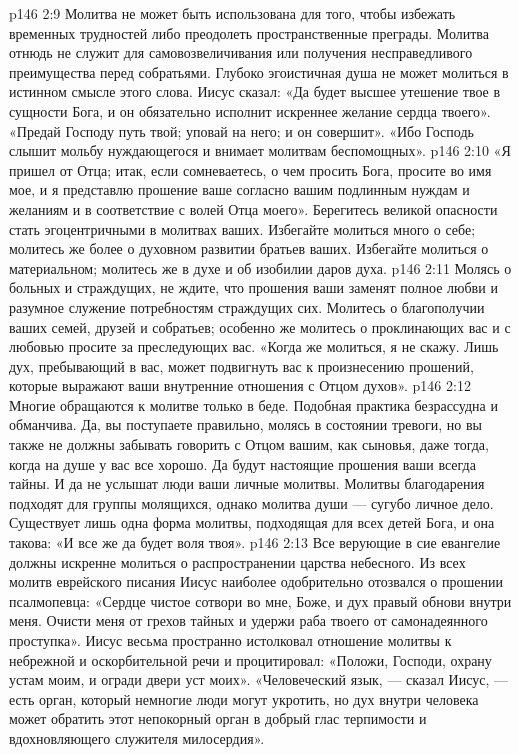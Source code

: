 \vs p146 2:9 \pc {}\bibnobreakspace Молитва не может быть использована для того, чтобы избежать временных трудностей либо преодолеть пространственные преграды. Молитва отнюдь не служит для самовозвеличивания или получения несправедливого преимущества перед собратьями. Глубоко эгоистичная душа не может молиться в истинном смысле этого слова. Иисус сказал: «Да будет высшее утешение твое в сущности Бога, и он обязательно исполнит искреннее желание сердца твоего». «Предай Господу путь твой; уповай на него; и он совершит». «Ибо Господь слышит мольбу нуждающегося и внимает молитвам беспомощных».
\vs p146 2:10 \pc {}\bibnobreakspace «Я пришел от Отца; итак, если сомневаетесь, о чем просить Бога, просите во имя мое, и я представлю прошение ваше согласно вашим подлинным нуждам и желаниям и в соответствие с волей Отца моего». Берегитесь великой опасности стать эгоцентричными в молитвах ваших. Избегайте молиться много о себе; молитесь же более о духовном развитии братьев ваших. Избегайте молиться о материальном; молитесь же в духе и об изобилии даров духа.
\vs p146 2:11 \pc {}\bibnobreakspace Молясь о больных и страждущих, не ждите, что прошения ваши заменят полное любви и разумное служение потребностям страждущих сих. Молитесь о благополучии ваших семей, друзей и собратьев; особенно же молитесь о проклинающих вас и с любовью просите за преследующих вас. «Когда же молиться, я не скажу. Лишь дух, пребывающий в вас, может подвигнуть вас к произнесению прошений, которые выражают ваши внутренние отношения с Отцом духов».
\vs p146 2:12 \pc {}\bibnobreakspace Многие обращаются к молитве только в беде. Подобная практика безрассудна и обманчива. Да, вы поступаете правильно, молясь в состоянии тревоги, но вы также не должны забывать говорить с Отцом вашим, как сыновья, даже тогда, когда на душе у вас все хорошо. Да будут настоящие прошения ваши всегда тайны. И да не услышат люди ваши личные молитвы. Молитвы благодарения подходят для группы молящихся, однако молитва души --- сугубо личное дело. Существует лишь одна форма молитвы, подходящая для всех детей Бога, и она такова: «И все же да будет воля твоя».
\vs p146 2:13 \pc {}\bibnobreakspace Все верующие в сие евангелие должны искренне молиться о распространении царства небесного. Из всех молитв еврейского писания Иисус наиболее одобрительно отозвался о прошении псалмопевца: «Сердце чистое сотвори во мне, Боже, и дух правый обнови внутри меня. Очисти меня от грехов тайных и удержи раба твоего от самонадеянного проступка». Иисус весьма пространно истолковал отношение молитвы к небрежной и оскорбительной речи и процитировал: «Положи, Господи, охрану устам моим, и огради двери уст моих». «Человеческий язык, --- сказал Иисус, --- есть орган, который немногие люди могут укротить, но дух внутри человека может обратить этот непокорный орган в добрый глас терпимости и вдохновляющего служителя милосердия».
